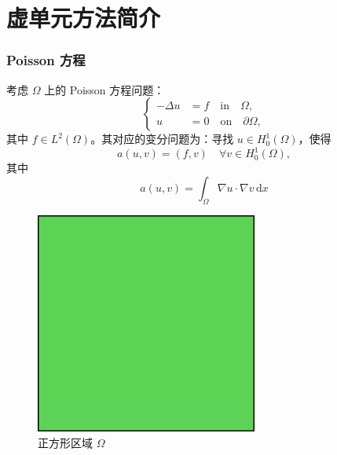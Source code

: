 \documentclass[notheorems,serif]{beamer}
\begin{document}
\section{虚单元方法简介}
%
\begin{frame}\frametitle{Poisson 方程}
\begin{minipage}[b]{0.6\linewidth}
考虑 $\Omega$ 上的 Poisson 方程问题：
$$
\left\{
\begin{aligned}
-\Delta u &= f \quad \text{in} \quad \Omega, \\
u &= 0 \quad \text{on} \quad \partial \Omega,
\end{aligned}
\right.
$$
其中 $f \in L^2(\Omega)$。其对应的变分问题为：寻找 $u \in H^1_0(\Omega)$，使得
$$
a(u, v) = (f, v) \quad \forall v \in H^1_0(\Omega),
$$
其中 
$$
a(u, v) = \int_{\Omega} \nabla u \cdot \nabla v \, \mathrm{d} x
$$
\end{minipage}
\hfill
\begin{minipage}[b]{0.38\linewidth}
    \centering
    \begin{figure}[htpb]
        \centering
        \includegraphics[width=0.65\textwidth]{../figures/domain_quad.pdf}
        \caption{正方形区域 $\Omega$}
    \end{figure}
\end{minipage}

\end{frame}
\end{document}
